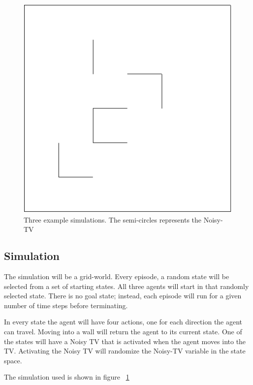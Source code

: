 \documentclass[12pt]{thesis}
\begin{document}
\begin{figure}
\begin{center}
	\includegraphics[scale=0.75]{"images/NoTvSim.pdf"}
	\end{center}
	\caption{Three example simulations. The semi-circles represents the Noisy-TV}
	\label{Fig:Sim}
\end{figure}
\subsection{Simulation}
The simulation will be a grid-world. Every episode, a random state will be selected from a set of starting states. All three agents will start in that randomly selected state. There is no goal state; instead, each episode will run for a given number of time steps before terminating.

In every state the agent will have four actions, one for each direction the agent can travel. Moving into a wall will return the agent to its current state. One of the states will have a Noisy TV that is activated when the agent moves into the TV. Activating the Noisy TV will randomize the Noisy-TV variable in the state space.

The simulation used is shown in figure 
\figurename~\ref{Fig:Sim}

\end{document}
